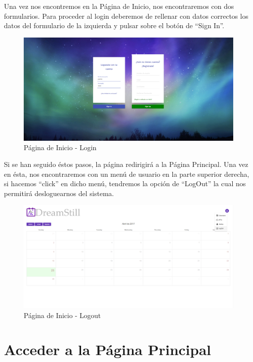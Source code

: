 \documentclass[11pt,openany]{book}
\begin{document}
Una vez nos encontremos en la Página de Inicio, nos encontraremos con dos formularios. Para proceder al login deberemos de rellenar con datos correctos los datos del formulario de la izquierda y pulsar sobre el botón de ``Sign In''.

\begin{figure}[H]
\centering
\includegraphics[totalheight=6cm]{manualUsuario/login.png}
\caption{Página de Inicio - Login}
\end{figure}

\pagebreak
Si se han seguido éstos pasos, la página redirigirá a la Página Principal. Una vez en ésta, nos encontraremos con un menú de usuario en la parte superior derecha, si hacemos ``click'' en dicho menú, tendremos la opción de ``LogOut'' la cual nos permitirá desloguearnos del sistema.

\begin{figure}[H]
\centering
\includegraphics[totalheight=6cm]{manualUsuario/logout.png}
\caption{Página de Inicio - Logout}
\end{figure}

\pagebreak
\section{Acceder a la Página Principal}
\end{document}

